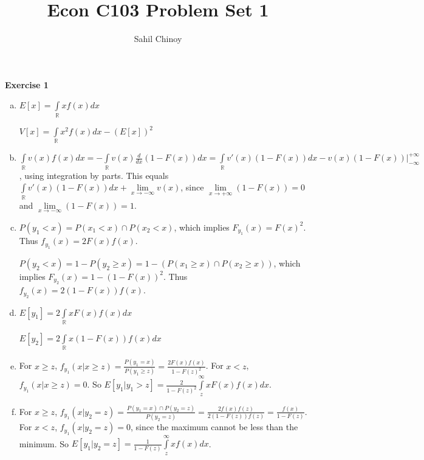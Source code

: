 \documentclass{article}
\title{Econ C103 Problem Set 1}
\author{Sahil Chinoy}
\newcommand{\heading}[1]{\bigskip \textbf{#1}}
\begin{document}
\maketitle{}

\heading{Exercise 1}

\begin{enumerate}[(a)]

	\item
	
	$E[x] = \int \limits_{\mathbb{R}} x f(x) dx$

	$V[x]= \int \limits_{\mathbb{R}} x^2 f(x) dx - (E[x])^2$

	\item

	$\int \limits_{\mathbb{R}} v(x) f(x) dx = - \int \limits_{\mathbb{R}} v(x) \frac{d}{dx}(1 - F(x)) dx = \int \limits_{\mathbb{R}} v'(x) (1 - F(x)) dx  - v(x)(1 - F(x)) \bigg\rvert_{-\infty} ^{+\infty}$, using integration by parts. This equals $\int \limits_{\mathbb{R}} v'(x) (1 - F(x)) dx  + \underset{x \to -\infty}\lim v(x) $, since $\underset{x \to +\infty}\lim (1 - F(x)) = 0$ and $\underset{x \to -\infty}\lim (1 - F(x)) = 1$.

	\item

	$P(y_1 < x) = P(x_1 < x) \cap P(x_2 < x)$, which implies $F_{y_1}(x) = F(x)^2$. Thus $f_{y_1}(x) = 2 F(x) f(x)$.

	$P(y_2 < x) = 1 - P(y_2 \geq x) = 1 - (P(x_1 \geq x) \cap P(x_2 \geq x)) $, which implies $F_{y_2}(x) = 1 - (1 - F(x))^2$. Thus $f_{y_2}(x) = 2 (1 - F(x)) f(x)$.

	\item

	$E[y_1] = 2 \int \limits_{\mathbb{R}} x F(x) f(x) dx$

	$E[y_2] = 2 \int \limits_{\mathbb{R}} x (1 - F(x)) f(x) dx$

	\item

	For $x \geq z$, $f_{y_1}(x | x \geq z) = \frac{P(y_1 = x)} {P(y_1 \geq z) } = \frac{2 F(x) f(x)} {1 - F(z)^2}$. For $x < z$, $f_{y_1}(x | x \geq z) = 0$. So $E[y_1 | y_1 > z] = \frac{2} {1 - F(z)^2} \int \limits_{z}^\infty x F(x) f(x) dx$.

	\item 

	For $x \geq z$, $f_{y_1}(x | y_2 = z) = \frac{P(y_1 = x) \cap P(y_2 = z)}{ P(y_2 = z) } = \frac{2 f(x) f(z)} {2 (1 - F(z)) f(z)} = \frac{f(x)}{1 - F(z)}$. For $x < z$, $f_{y_1}(x | y_2 = z) = 0$, since the maximum cannot be less than the minimum. So $E[y_1 | y_2 = z] = \frac{1}{1 - F(z)}\int \limits_{z}^\infty x f(x) dx$.

\end{enumerate}
\end{document}
